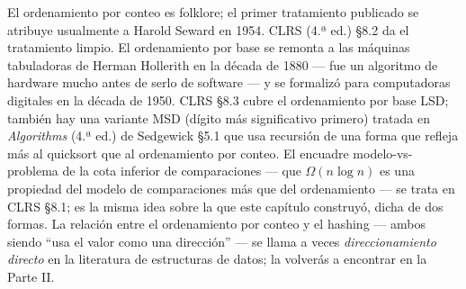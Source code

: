 \documentclass[11pt,a4paper]{article}
\begin{document}
El ordenamiento por conteo es folklore; el primer tratamiento publicado se atribuye usualmente a Harold Seward en 1954. CLRS (4.ª ed.) \S 8.2 da el tratamiento limpio. El ordenamiento por base se remonta a las máquinas tabuladoras de Herman Hollerith en la década de 1880 --- fue un algoritmo de hardware mucho antes de serlo de software --- y se formalizó para computadoras digitales en la década de 1950. CLRS \S 8.3 cubre el ordenamiento por base LSD; también hay una variante MSD (dígito más significativo primero) tratada en \emph{Algorithms} (4.ª ed.) de Sedgewick \S 5.1 que usa recursión de una forma que refleja más al quicksort que al ordenamiento por conteo. El encuadre modelo-vs-problema de la cota inferior de comparaciones --- que $\Omega(n \log n)$ es una propiedad del modelo de comparaciones más que del ordenamiento --- se trata en CLRS \S 8.1; es la misma idea sobre la que este capítulo construyó, dicha de dos formas. La relación entre el ordenamiento por conteo y el hashing --- ambos siendo ``usa el valor como una dirección'' --- se llama a veces \emph{direccionamiento directo} en la literatura de estructuras de datos; la volverás a encontrar en la Parte II.
\end{document}
